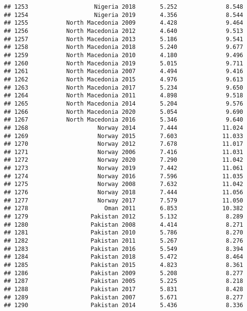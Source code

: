 \documentclass[
]{article}
\begin{document}
\begin{verbatim}
## 1253                   Nigeria 2018       5.252              8.548
## 1254                   Nigeria 2019       4.356              8.544
## 1255           North Macedonia 2009       4.428              9.464
## 1256           North Macedonia 2012       4.640              9.513
## 1257           North Macedonia 2013       5.186              9.541
## 1258           North Macedonia 2018       5.240              9.677
## 1259           North Macedonia 2010       4.180              9.496
## 1260           North Macedonia 2019       5.015              9.711
## 1261           North Macedonia 2007       4.494              9.416
## 1262           North Macedonia 2015       4.976              9.613
## 1263           North Macedonia 2017       5.234              9.650
## 1264           North Macedonia 2011       4.898              9.518
## 1265           North Macedonia 2014       5.204              9.576
## 1266           North Macedonia 2020       5.054              9.690
## 1267           North Macedonia 2016       5.346              9.640
## 1268                    Norway 2014       7.444             11.024
## 1269                    Norway 2015       7.603             11.033
## 1270                    Norway 2012       7.678             11.017
## 1271                    Norway 2006       7.416             11.031
## 1272                    Norway 2020       7.290             11.042
## 1273                    Norway 2019       7.442             11.061
## 1274                    Norway 2016       7.596             11.035
## 1275                    Norway 2008       7.632             11.042
## 1276                    Norway 2018       7.444             11.056
## 1277                    Norway 2017       7.579             11.050
## 1278                      Oman 2011       6.853             10.382
## 1279                  Pakistan 2012       5.132              8.289
## 1280                  Pakistan 2008       4.414              8.271
## 1281                  Pakistan 2010       5.786              8.270
## 1282                  Pakistan 2011       5.267              8.276
## 1283                  Pakistan 2016       5.549              8.394
## 1284                  Pakistan 2018       5.472              8.464
## 1285                  Pakistan 2015       4.823              8.361
## 1286                  Pakistan 2009       5.208              8.277
## 1287                  Pakistan 2005       5.225              8.218
## 1288                  Pakistan 2017       5.831              8.428
## 1289                  Pakistan 2007       5.671              8.277
## 1290                  Pakistan 2014       5.436              8.336

\end{verbatim}
\end{document}

